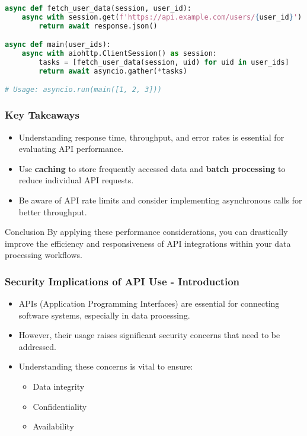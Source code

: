 \documentclass[aspectratio=169]{beamer}
\begin{document}
\begin{frame}[fragile]
\begin{itemize}
\begin{itemize}
\begin{lstlisting}[language=Python]
async def fetch_user_data(session, user_id):
    async with session.get(f'https://api.example.com/users/{user_id}') as response:
        return await response.json()

async def main(user_ids):
    async with aiohttp.ClientSession() as session:
        tasks = [fetch_user_data(session, uid) for uid in user_ids]
        return await asyncio.gather(*tasks)

# Usage: asyncio.run(main([1, 2, 3]))
            \end{lstlisting}
        \end{itemize}
    \end{itemize}
\end{frame}

\begin{frame}[fragile]
    \frametitle{Key Takeaways}
    \begin{itemize}
        \item Understanding response time, throughput, and error rates is essential for evaluating API performance.
        \item Use \textbf{caching} to store frequently accessed data and \textbf{batch processing} to reduce individual API requests.
        \item Be aware of API rate limits and consider implementing asynchronous calls for better throughput.
    \end{itemize}
    \begin{block}{Conclusion}
        By applying these performance considerations, you can drastically improve the efficiency and responsiveness of API integrations within your data processing workflows.
    \end{block}
\end{frame}

\begin{frame}[fragile]
    \frametitle{Security Implications of API Use - Introduction}
    \begin{itemize}
        \item APIs (Application Programming Interfaces) are essential for connecting software systems, especially in data processing.
        \item However, their usage raises significant security concerns that need to be addressed.
        \item Understanding these concerns is vital to ensure:
        \begin{itemize}
            \item Data integrity
            \item Confidentiality
            \item Availability
        \end{itemize}
    \end{itemize}
\end{frame}
\end{document}
